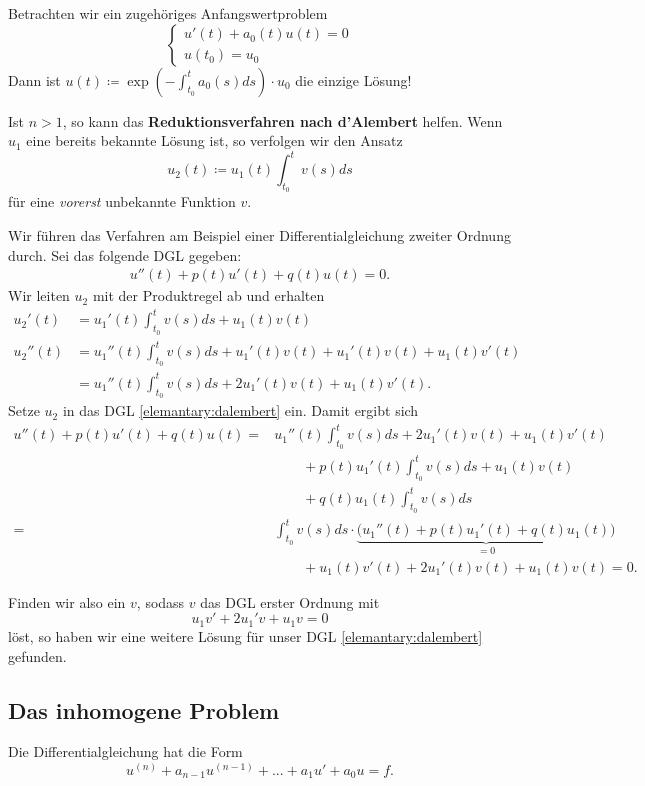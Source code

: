 \documentclass[a4paper]{book}
\theoremstyle{plain}
\theoremstyle{definition}
\newcommand{\vbreak}{\vspace{8mm}}
\begin{document}
Betrachten wir ein zugehöriges Anfangswertproblem
\[
	\begin{cases}
		u'(t) +a_0(t)u(t) = 0 \\
		u(t_0) = u_0
	\end{cases}
\]
Dann ist 
$ u(t) \coloneqq \exp{\left(- \int^t_{t_0}a_0(s) ds\right)} \cdot u_0 $ die einzige Lösung!
\vbreak

Ist $n>1$, so kann das \textbf{Reduktionsverfahren nach d'Alembert} helfen. Wenn $u_1$ eine bereits bekannte Lösung ist, so verfolgen wir den Ansatz
\[
	u_2(t) \coloneqq u_1(t) \int^t_{t_0}v(s)ds
\]
für eine \emph{vorerst} unbekannte Funktion $v$.

Wir führen das Verfahren am Beispiel einer Differentialgleichung zweiter Ordnung durch. Sei das folgende  DGL gegeben:
\begin{align}\label{elemantary:dalembert}
	u''(t) + p(t)u'(t) + q(t)u(t) = 0.
\end{align}
Wir leiten $u_2$ mit der Produktregel ab und erhalten
\begin{align*}
	u_2'(t) &= u_1'(t) \int^t_{t_0}v(s)ds + u_1(t)v(t) \\
	u_2''(t) &= u_1''(t)  \int^t_{t_0}v(s)ds + u_1'(t)v(t) + u_1'(t)v(t) + u_1(t)v'(t) \\
	&= u_1''(t)  \int^t_{t_0}v(s)ds + 2u_1'(t)v(t) + u_1(t)v'(t).
\end{align*}
Setze $u_2$ in das DGL \eqref{elemantary:dalembert} ein. Damit ergibt sich
\begin{align*}
u''(t) +p(t)u'(t) +q(t)u(t) =
	& u_1''(t)  \int^t_{t_0}v(s)ds + 2u_1'(t)v(t) + u_1(t)v'(t) \\
	 & \qquad+ p(t)u_1'(t) \int^t_{t_0}v(s)ds + u_1(t)v(t) \\
	 & \qquad+ q(t)u_1(t)\int^t_{t_0}v(s)ds \\
	= & \int^t_{t_0} v(s)ds \cdot \underbrace{\big(u_1''(t) +p(t)u_1'(t) + q(t)u_1(t)\big)}_{=0} \\
	& \qquad +u_1(t)v'(t) + 2u_1'(t)v(t) + u_1(t)v(t) = 0.
\end{align*}

Finden wir also ein $v$, sodass $v$ das DGL erster Ordnung mit $$u_1v' + 2u_1'v + u_1v=0$$ löst, so haben wir eine weitere Lösung für unser DGL \eqref{elemantary:dalembert} gefunden.

\subsection{Das inhomogene Problem}
Die Differentialgleichung hat die Form $$u^{(n)} + a_{n-1}u^{(n-1)} + ... + a_1 u' + a_0u = f.$$
\end{document}
